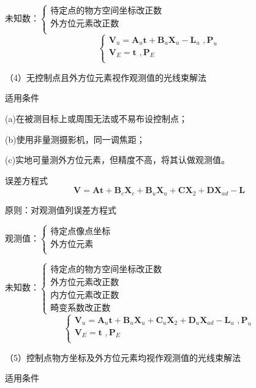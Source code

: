 \documentclass[a4paper]{ctexart}
\begin{document}
未知数：$\begin{cases}
	\text{待定点的物方空间坐标改正数}\\
	\text{外方位元素改正数}\\
\end{cases}$
$$
\begin{cases}
	\boldsymbol{V}_u=\boldsymbol{A}_u\boldsymbol{t}+\boldsymbol{B}_u\boldsymbol{X}_u-\boldsymbol{L}_u\,\,, \boldsymbol{P}_u\\
	\boldsymbol{V}_E=\boldsymbol{t}\,\,, \boldsymbol{P}_E\\
\end{cases}
$$

（4）无控制点且外方位元素视作观测值的光线束解法

适用条件

(a)在被测目标上或周围无法或不易布设控制点；

(b)使用非量测摄影机，同一调焦距；

(c)实地可量测外方位元素，但精度不高，将其认做观测值。

误差方程式
$$
\boldsymbol{V}=\boldsymbol{At}+\boldsymbol{B}_c\boldsymbol{X}_c+\boldsymbol{B}_u\boldsymbol{X}_u+\boldsymbol{CX}_2+\boldsymbol{DX}_{ad}-\boldsymbol{L}
$$

原则：对观测值列误差方程式

观测值：$\begin{cases}
	\text{待定点像点坐标}\\
	\text{外方位元素}\\
\end{cases}$

未知数：$\begin{cases}
	\text{待定点的物方空间坐标改正数}\\
	\text{外方位元素改正数}\\
\text{内方位元素改正数}\\
\text{畸变系数改正数}
\end{cases}$
$$
\begin{cases}
	\boldsymbol{V}_u=\boldsymbol{A}_u\boldsymbol{t}+\boldsymbol{B}_u\boldsymbol{X}_u+\boldsymbol{C}_u\boldsymbol{X}_2+\boldsymbol{D}_u\boldsymbol{X}_{ad}-\boldsymbol{L}_u\,\,, \boldsymbol{P}_u\\
	\boldsymbol{V}_E=\boldsymbol{t}\,\,, \boldsymbol{P}_E\\
\end{cases}
$$

（5）控制点物方坐标及外方位元素均视作观测值的光线束解法

适用条件
\end{document}
